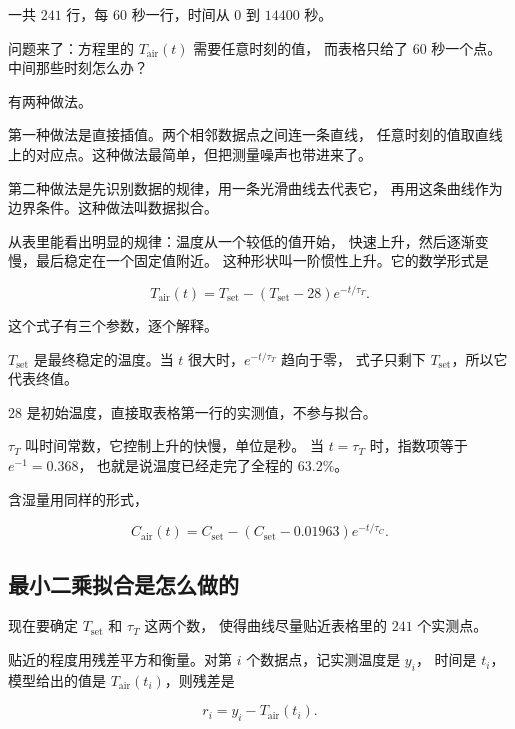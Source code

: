 一共 $241$ 行，每 $60$ 秒一行，时间从 $0$ 到 $14400$ 秒。

问题来了：方程里的 $T_{\mathrm{air}}(t)$ 需要任意时刻的值，
而表格只给了 $60$ 秒一个点。中间那些时刻怎么办？

有两种做法。

第一种做法是直接插值。两个相邻数据点之间连一条直线，
任意时刻的值取直线上的对应点。这种做法最简单，但把测量噪声也带进来了。

第二种做法是先识别数据的规律，用一条光滑曲线去代表它，
再用这条曲线作为边界条件。这种做法叫数据拟合。

从表里能看出明显的规律：温度从一个较低的值开始，
快速上升，然后逐渐变慢，最后稳定在一个固定值附近。
这种形状叫一阶惯性上升。它的数学形式是

\begin{equation}
T_{\mathrm{air}}(t)=T_{\mathrm{set}}-\left(T_{\mathrm{set}}-28\right)e^{-t/\tau_T}.
\label{eq:fitted-T}
\end{equation}

这个式子有三个参数，逐个解释。

$T_{\mathrm{set}}$ 是最终稳定的温度。当 $t$ 很大时，$e^{-t/\tau_T}$ 趋向于零，
式子只剩下 $T_{\mathrm{set}}$，所以它代表终值。

$28$ 是初始温度，直接取表格第一行的实测值，不参与拟合。

$\tau_T$ 叫时间常数，它控制上升的快慢，单位是秒。
当 $t=\tau_T$ 时，指数项等于 $e^{-1}=0.368$，
也就是说温度已经走完了全程的 $63.2\%$。

含湿量用同样的形式，

\begin{equation}
C_{\mathrm{air}}(t)=C_{\mathrm{set}}-\left(C_{\mathrm{set}}-0.01963\right)e^{-t/\tau_C}.
\label{eq:fitted-C}
\end{equation}

\subsection{最小二乘拟合是怎么做的}

现在要确定 $T_{\mathrm{set}}$ 和 $\tau_T$ 这两个数，
使得曲线尽量贴近表格里的 $241$ 个实测点。

贴近的程度用残差平方和衡量。对第 $i$ 个数据点，记实测温度是 $y_i$，
时间是 $t_i$，模型给出的值是 $T_{\mathrm{air}}(t_i)$，则残差是

\begin{equation}
r_i = y_i - T_{\mathrm{air}}(t_i).
\end{equation}

